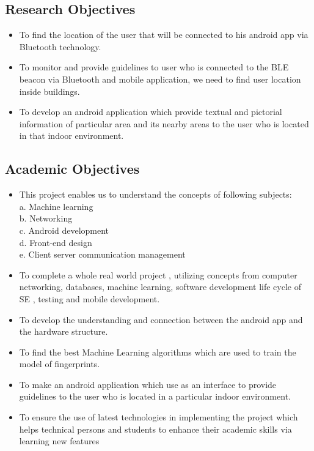 \documentclass{article}
\begin{document}
\subsection{Research Objectives}
\begin{itemize}
\item To find the location of the user that will be connected to his android app via Bluetooth technology\cite{Introduction}.
\item To monitor and provide guidelines to user who is connected to the BLE beacon via Bluetooth and mobile application, we need to find user location inside buildings.
\item To develop an android application which provide textual and pictorial information of particular area and its nearby areas to the user who is located in that indoor environment.


\end{itemize}
\subsection{Academic Objectives}
\begin{itemize}
\item This project enables us to understand the concepts of following subjects:
\\a.	Machine learning
\\b.	Networking
\\c.	Android development
\\d.	Front-end design
\\e.	Client server communication management
\item To complete a whole real world project , utilizing concepts from computer networking, databases, machine learning, software development life cycle of SE , testing and mobile development.
\item To develop the understanding and connection between the android app and the hardware structure. 
\item To find the best Machine Learning algorithms which are used to train the model of fingerprints. 
\item To make an android application which use as an interface to provide guidelines to the user who is located in a particular indoor environment.
\item To ensure the use of latest technologies in implementing the project which helps technical persons and students to enhance their academic skills via learning new features


\end{itemize}
\end{document}
